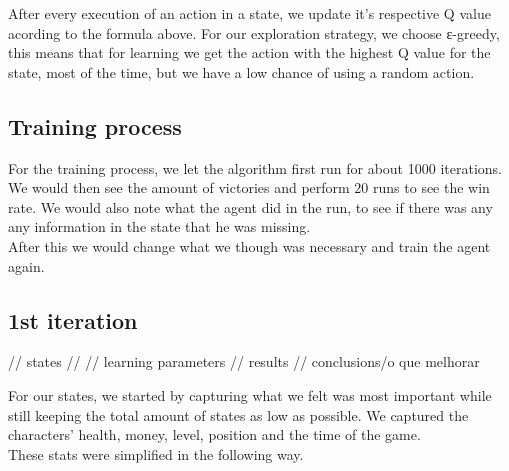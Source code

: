 \documentclass{article}
\begin{document}
  After every execution of an action in a state, we update it's respective Q value acording to the formula above. 
  For our exploration strategy, we choose ε-greedy, this means that for learning we get the action with the highest Q value for
  the state, most of the time, but we have a low chance of using a random action.\\
  
  \subsection{Training process}
  For the training process, we let the algorithm first run for about 1000 iterations.
  We would then see the amount of victories and perform 20 runs to see the win rate.
  We would also note what the agent did in the run, to see if there was any any information
  in the state that he was missing.\\
  After this we would change what we though was necessary and train the agent again.

  \subsection{1st iteration}
  // states
  // 
  // learning parameters
  // results
  // conclusions/o que melhorar

  For our states, we started by capturing what we felt was most important while still keeping the total amount of states as low as possible.
  We captured the characters' health, money, level, position and the time of the game.\\
  These stats were simplified in the following way.\\
\end{document}
